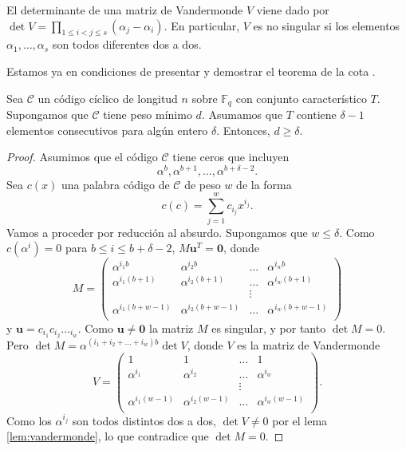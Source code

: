 \begin{lemma}
  \label{lem:vandermonde}
  El determinante de una matriz de Vandermonde \(V\) viene dado por \(\operatorname{det}V = \prod_{1 \leq i < j \leq s}(\alpha_j - \alpha_i)\).
  En particular, \(V\) es no singular si los elementos \(\alpha_1, \dots, \alpha_s\) son todos diferentes dos a dos.
\end{lemma}

Estamos ya en condiciones de presentar y demostrar el teorema de la cota .

\begin{theorem}
  Sea \(\mathcal C\) un código cíclico de longitud \(n\) sobre \(\mathbb F_q\) con conjunto característico \(T\).
  Supongamos que \(\mathcal C\) tiene peso mínimo \(d\).
  Asumamos que \(T\) contiene \(\delta - 1\) elementos consecutivos para algún entero \(\delta\).
  Entonces, \(d \geq \delta\).
\end{theorem}

\begin{proof}
  Asumimos que el código \(\mathcal C\) tiene ceros que incluyen
  \[
    \alpha^b, \alpha^{b+1}, \dots, \alpha^{b + \delta - 2}.
  \]
  Sea \(c(x)\) una palabra código de \(\mathcal C\) de peso \(w\) de la forma
  \[
    c(c) = \sum_{j = 1}^w c_{i_j}x^{i_j}.
  \]
  Vamos a proceder por reducción al absurdo.
  Supongamos que \(w \leq \delta\).
  Como \(c(\alpha^i) = 0\) para \(b \leq i \leq b + \delta - 2\), \(M \mathbf{u}^T = \mathbf{0}\), donde
  \[
    M = \begin{pmatrix}
      \alpha^{i_1b} & \alpha^{i_2b} & \dots & \alpha^{i_wb}\\
      \alpha^{i_1(b+1)} & \alpha^{i_2(b+1)} & \dots & \alpha^{i_w(b+1)}\\
        & & \vdots & \\
      \alpha^{i_1(b+w-1)} & \alpha^{i_2(b+w-1)} & \dots & \alpha^{i_w(b+w-1)}\\
    \end{pmatrix}
  \]
  y \(\mathbf{u} = c_{i_1}c_{i_2}\dotsc_{i_w}\).
  Como \(\mathbf{u} \neq \mathbf{0}\) la matriz \(M\) es singular, y por tanto \(\det M = 0\).
  Pero \(\det M = \alpha^{(i_1 + i_2 + \dots + i_w)b}\det V\), donde \(V\) es la matriz de Vandermonde
  \[
    V = \begin{pmatrix}
      1 & 1 & \dots & 1 \\
      \alpha^{i_1} & \alpha^{i_2} & \dots & \alpha^{i_w} \\
       &  & \vdots & \\
      \alpha^{i_1(w - 1)} & \alpha^{i_2(w - 1)} & \dots & \alpha^{i_w(w - 1)} \\
    \end{pmatrix}.
  \]
  Como los \(\alpha^{i_j}\) son todos distintos dos a dos, \(\det V \neq 0\) por el lema \ref{lem:vandermonde}, lo que contradice que \(\det M = 0\).
\end{proof}

